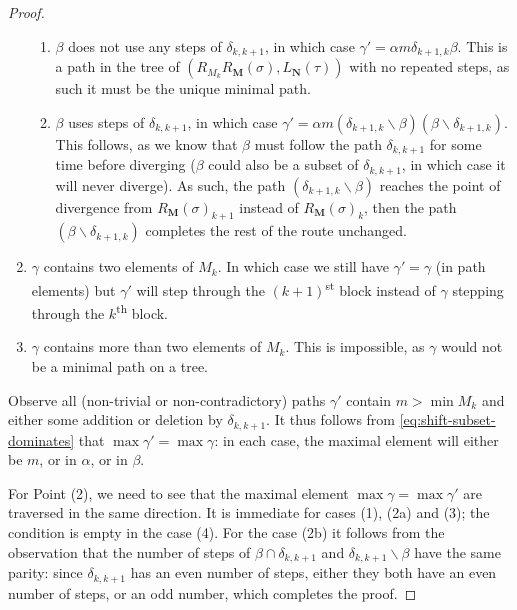 \documentclass{amsart}
\theoremstyle{definition}
\newcommand{\ssm}{\smallsetminus} %
\newcommand{\ordinal}{\textsuperscript{th}} %
\newcommand{\ordinalst}{\textsuperscript{st}} %
\begin{document}
\begin{proof}
\begin{enumerate}
\begin{enumerate}
        \item $\beta$ does not use any steps of $\delta_{k,k+1}$, in which case $\gamma' = \alpha m \delta_{k+1,k} \beta$.
        This is a path in the tree of $(R_{M_k}R_{\mathbf{M}}(\sigma),L_{\mathbf{N}}(\tau))$ with no repeated steps, as such it must be the unique minimal path. 
        
        \item $\beta$ uses steps of $\delta_{k,k+1}$, in which case $\gamma' = \alpha m (\delta_{k+1,k}\ssm \beta)(\beta \ssm \delta_{k+1,k})$.
        This follows, as we know that $\beta$ must follow the path $\delta_{k,k+1}$ for some time before diverging ($\beta$ could also be a subset of $\delta_{k,k+1}$, in which case it will never diverge).
        As such, the path $(\delta_{k+1,k}\ssm \beta)$ reaches the point of divergence from $R_{\mathbf{M}}(\sigma)_{k+1}$ instead of $R_{\mathbf{M}}(\sigma)_{k}$, then the path $(\beta \ssm \delta_{k+1,k})$ completes the rest of the route unchanged.

    \end{enumerate}

    \item $\gamma$ contains two elements of $M_k$. In which case we still have $\gamma'=\gamma$ (in path elements) but $\gamma'$ will step through the $(k+1)$\ordinalst{} block instead of $\gamma$ stepping through the $k$\ordinal{} block.
    
    \item $\gamma$ contains more than two elements of $M_k$. 
    This is impossible, as $\gamma$ would not be a minimal path on a tree.

\end{enumerate}
Observe all (non-trivial or non-contradictory) paths $\gamma'$ contain $m>\min M_k$ and either some addition or deletion by $\delta_{k,k+1}$.
It thus follows from \cref{eq:shift-subset-dominates} that $\max \gamma' = \max \gamma$: in each case, the maximal element will either be $m$, or in $\alpha$, or in $\beta$.

For Point (2), we need to see that the maximal element $\max \gamma = \max \gamma'$ are traversed in the same direction.
It is immediate for cases (1), (2a) and (3); the condition is empty in the case (4).
For the case (2b) it follows from the observation that the number of steps of $\beta \cap \delta_{k,k+1}$ and $\delta_{k,k+1} \ssm \beta$ have the same parity: since $\delta_{k,k+1}$ has an even number of steps, either they both have an even number of steps, or an odd number, which completes the proof.
\end{proof}
\end{document}
